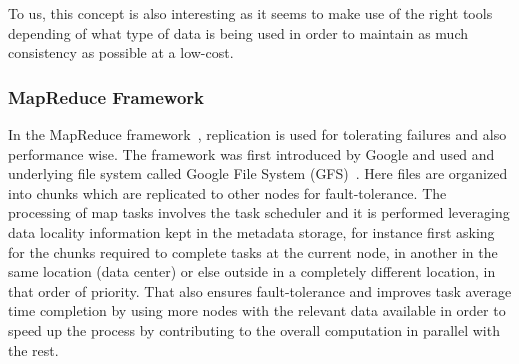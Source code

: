 To us, this concept is also interesting as it seems to make use of the right tools depending of what type of data is being used in order to maintain as much consistency as possible at a low-cost.

\subsubsection{MapReduce Framework}
In the MapReduce framework~\cite{Dean:04}, replication is used for tolerating failures and also performance wise. The framework was first introduced by Google and used and underlying file system called Google File System (GFS)~\cite{Ghemawat:03}. Here files are organized into chunks which are replicated to other nodes for fault-tolerance. The processing of map tasks involves the task scheduler and it is performed leveraging data locality information kept in the metadata storage, for instance first asking for the chunks required to complete tasks at the current node, in another in the same location (data center) or else outside in a completely different location, in that order of priority. That also ensures fault-tolerance and improves task average time completion by using more nodes with the relevant data available in order to speed up the process by contributing to the overall computation in parallel with the rest.


